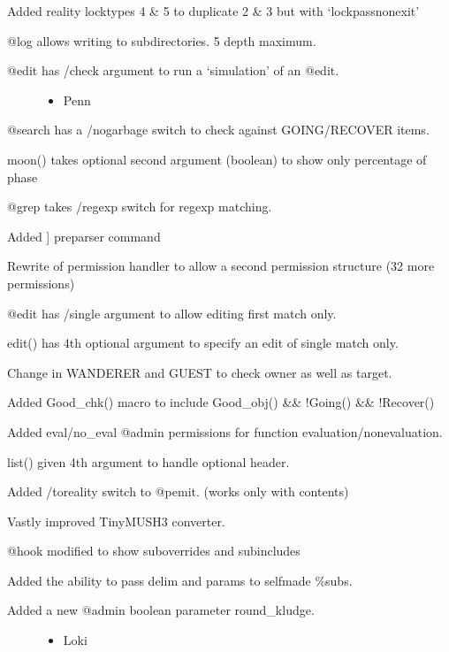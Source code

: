 \documentclass[letterpaper,10pt,english]{sphinxmanual}
\begin{document}
\sphinxAtStartPar
Added reality locktypes 4 \& 5 to duplicate 2 \& 3 but with ‘lock\sphinxhyphen{}pass\sphinxhyphen{}nonexit’

\sphinxAtStartPar
@log allows writing to subdirectories.  5 depth maximum.
\begin{description}
\item[{@edit has /check argument to run a ‘simulation’ of an @edit.}] \leavevmode\begin{itemize}
\item {} 
\sphinxAtStartPar
Penn

\end{itemize}

\end{description}

\sphinxAtStartPar
@search has a /nogarbage switch to check against GOING/RECOVER items.

\sphinxAtStartPar
moon() takes optional second argument (boolean) to show only percentage of phase

\sphinxAtStartPar
@grep takes /regexp switch for regexp matching.

\sphinxAtStartPar
Added {]} pre\sphinxhyphen{}parser command

\sphinxAtStartPar
Rewrite of permission handler to allow a second permission structure (32 more permissions)

\sphinxAtStartPar
@edit has /single argument to allow editing first match only.

\sphinxAtStartPar
edit() has 4th optional argument to specify an edit of single match only.

\sphinxAtStartPar
Change in WANDERER and GUEST to check owner as well as target.

\sphinxAtStartPar
Added Good\_chk() macro to include Good\_obj() \&\& !Going() \&\& !Recover()

\sphinxAtStartPar
Added eval/no\_eval @admin permissions for function evaluation/non\sphinxhyphen{}evaluation.

\sphinxAtStartPar
list() given 4th argument to handle optional header.

\sphinxAtStartPar
Added /toreality switch to @pemit. (works only with contents)

\sphinxAtStartPar
Vastly improved TinyMUSH3 converter.

\sphinxAtStartPar
@hook modified to show sub\sphinxhyphen{}overrides and sub\sphinxhyphen{}includes

\sphinxAtStartPar
Added the ability to pass delim and params to self\sphinxhyphen{}made \%\sphinxhyphen{}subs.
\begin{description}
\item[{Added a new @admin boolean parameter round\_kludge.}] \leavevmode\begin{itemize}
\item {} 
\sphinxAtStartPar
Loki

\end{itemize}

\end{description}
\end{document}
